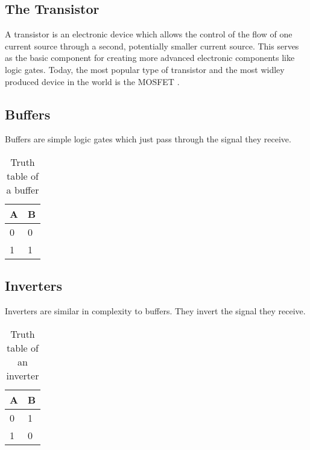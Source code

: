 \documentclass[11pt]{informatics-report}
\begin{document}
\subsection{The Transistor}
A transistor is an electronic device which allows the control of the flow of one current source through a second, potentially smaller current source. This serves as the basic component for creating more advanced electronic components like logic gates.
Today, the most popular type of transistor and the most widley produced device in the world is the MOSFET \cite{chm2019mosfet}.


\subsection{Buffers}
Buffers are simple logic gates which just pass through the signal they receive.
\begin{table}[h]
\centering
\begin{tabular}{l|l}
\hline
\multicolumn{1}{|l|}{\textbf{A}} & \multicolumn{1}{l|}{\textbf{B}} \\ \hline
0                                & 0                               \\
1                                & 1
\end{tabular}
\caption{Truth table of a buffer}
\label{tab:buffer-table}
\end{table}

\subsection{Inverters}
Inverters are similar in complexity to buffers. They invert the signal they receive.
\begin{table}[h]
\centering
\begin{tabular}{l|l}
\hline
\multicolumn{1}{|l|}{\textbf{A}} & \multicolumn{1}{l|}{\textbf{B}} \\ \hline
0                                & 1                               \\
1                                & 0
\end{tabular}
\caption{Truth table of an inverter}
\label{tab:inverter-table}
\end{table}
\end{document}
